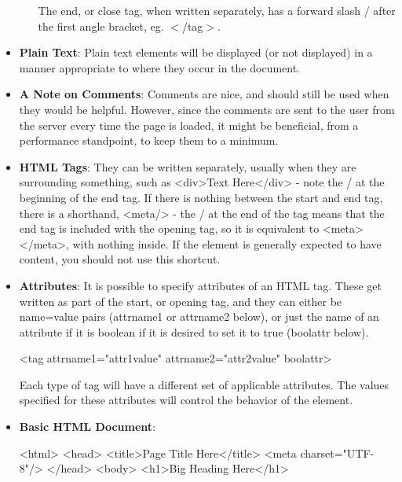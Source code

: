 \documentclass{report}
\begin{document}
\begin{itemize}
\begin{enumerate}
                    \bigbreak \noindent 
                    The end, or close tag, when written separately, has a forward slash / after the first angle bracket, eg. $<$/tag$>$.
            \end{enumerate}
        \item \textbf{Plain Text}: Plain text elements will be displayed (or not displayed) in a manner appropriate to where they occur in the document.
        \item \textbf{A Note on Comments}: Comments are nice, and should still be used when they would be helpful. However, since the comments are sent to the user from the server every time the page is loaded, it might be beneficial, from a performance standpoint, to keep them to a minimum.
        \item \textbf{HTML Tags}: They can be written separately, usually when they are surrounding something, such as <div>Text Here</div> - note the / at the beginning of the end tag.
            \bigbreak \noindent 
             If there is nothing between the start and end tag, there is a shorthand, <meta/> - the / at the end of the tag means that the end tag is included with the opening tag, so it is equivalent to <meta></meta>, with nothing inside.
             \bigbreak \noindent 
             If the element is generally expected to have content, you should not use this shortcut.
            \item \textbf{Attributes}: It is possible to specify attributes of an HTML tag. These get written as part of the start, or opening tag, and they can either be name=value pairs (attrname1 or attrname2 below), or just the name of an attribute if it is boolean if it is desired to set it to true (boolattr below).
                \bigbreak \noindent 
                \begin{htmlcode}
                <tag attrname1="attr1value" attrname2="attr2value" boolattr>
                \end{htmlcode}
                \bigbreak \noindent 
                Each type of tag will have a different set of applicable attributes. The values specified for these attributes will control the behavior of the element.
    \item \textbf{Basic HTML Document}:
        \bigbreak \noindent 
        \begin{htmlcode}
            <html>
                <head>
                    <title>Page Title Here</title>
                    <meta charset="UTF-8"/>
                </head>
                <body>
                    <h1>Big Heading Here</h1>

\end{htmlcode}
\end{itemize}
\end{document}
